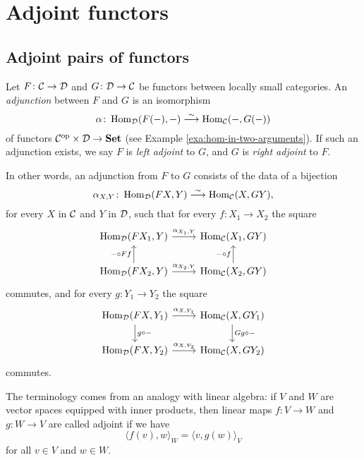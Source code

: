 
\chapter{Adjoint functors}\label{chapter:adjoint-functors}

\section{Adjoint pairs of functors}

\begin{definition}
Let $F\colon {\mathcal{C}} \to {\mathcal{D}}$ and $G\colon {\mathcal{D}} \to {\mathcal{C}}$ be functors between locally small categories. An \emph{adjunction} between $F$ and $G$ is an isomorphism 
\[
	\alpha\colon \operatorname{Hom}_{\mathcal{D}}( F(-), - ) \overset{\sim}{\longrightarrow} \operatorname{Hom}_{\mathcal{C}}( -, G(-) )
\]
of functors ${\mathcal{C}}^{\mathrm{op}} \times {\mathcal{D}} \to \mathbf{Set}$ (see Example \ref{exa:hom-in-two-arguments}). If such an adjunction exists, we say  $F$ is \emph{left adjoint} to $G$, and  $G$ is \emph{right adjoint} to $F$. 
\end{definition}


In other words, an adjunction from $F$ to $G$ consists of the data of a bijection
\begin{equation}\label{eqn:adjunction}
	\alpha_{X,Y}\colon \operatorname{Hom}_{\mathcal{D}}( FX, Y ) \overset{\sim}{\longrightarrow} \operatorname{Hom}_{\mathcal{C}}( X, GY ),
\end{equation}
for every $X$ in ${\mathcal{C}}$ and $Y$ in ${\mathcal{D}}$, such that for every $f\colon X_1\to X_2$ the square
\[
\begin{tikzcd}
\Hom_\cD( FX_1, Y ) \arrow{r}{\alpha_{X_1,Y}} & \Hom_\cC( X_1, GY ) \\
\Hom_\cD( FX_2, Y ) \arrow{r}{\alpha_{X_2,Y}} \arrow{u}{-\circ Ff}
	 & \Hom_\cC( X_2, GY ) \arrow{u}{-\circ f}
\end{tikzcd}
\]
commutes, and for every $g\colon Y_1\to Y_2$ the square
\[
\begin{tikzcd}
\Hom_\cD( FX, Y_1 ) \arrow{r}{\alpha_{X,Y_1}}  \arrow{d}{g\circ-}
	& \Hom_\cC( X, GY_1 ) \arrow{d}{Gg\circ -} \\
\Hom_\cD( FX, Y_2 ) \arrow{r}{\alpha_{X,Y_2}}
	 & \Hom_\cC( X, GY_2 )
\end{tikzcd}
\]
commutes. 

\begin{remark}
The terminology comes from an analogy with linear algebra: if $V$ and $W$ are vector spaces equipped with inner products, then linear maps $f\colon V\to W$ and $g\colon W\to V$ are called adjoint if we have
\[
	\langle f(v), w \rangle_W = \langle v, g(w) \rangle_V
\]
for all $v\in V$ and $w\in W$.
\end{remark}


